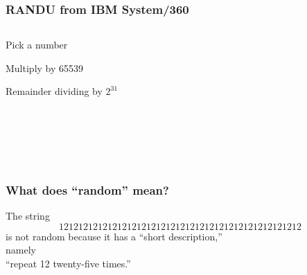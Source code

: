 \documentclass[14pt,aspectratio=169]{beamer}
\begin{document}
\begin{frame}
\frametitle{RANDU from IBM System/360}

  \begin{columns}
    \begin{column}{0.4\textwidth}
      \alert<2,5,8>{Pick a number}

      \alert<3,6,9>{Multiply by 65539}

      \alert<4,7,10>{Remainder dividing by $2^{31}$}
    \end{column}
    \begin{column}{0.6\textwidth}
       \\
      \quad{} \\
      \quad{}

       \\
      \quad{} \\
      \quad{} \\

       \\
      \quad{} \\
      \quad{} \\
    \end{column}
  \end{columns}

  \vfill
  \small

  \begin{center}
         
\end{center}

\begin{center}
\end{center}

\end{frame}

\begin{frame}
  \frametitle{What does ``random'' mean?}

  The string
  \[12121212121212121212121212121212121212121212121212\]
  is not random because it has a ``short description,'' \\
  \pause\quad namely \\
  ``repeat 12 twenty-five times.''
  
\end{frame}
\end{document}
